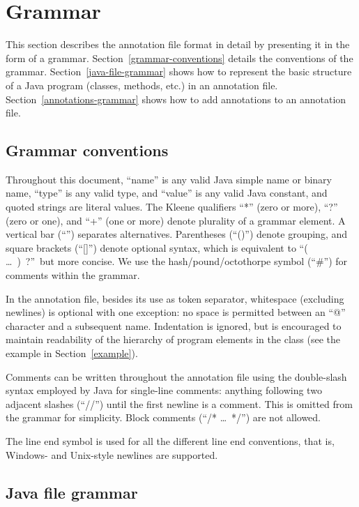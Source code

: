 \documentclass{article}
\begin{document}
\section{Grammar\label{grammar}}

This section describes the annotation file format in detail by presenting it in
the form of a grammar. Section~\ref{grammar-conventions} details the conventions
of the grammar. Section~\ref{java-file-grammar} shows how to represent the
basic structure of a Java program (classes, methods, etc.) in an annotation
file. Section~\ref{annotations-grammar} shows how to add annotations to an
annotation file.

\subsection{Grammar conventions\label{grammar-conventions}}

Throughout this document, ``name'' is any valid Java simple name or 
binary name, ``type'' is any valid type, and ``value'' is any
valid Java constant, and quoted strings are literal values.
%
The Kleene qualifiers ``*'' (zero or more), ``?'' (zero or one), and ``+''
(one or more) denote plurality of a grammar element.
%
A vertical bar (``\bnfor'') separates alternatives.
Parentheses (``()'') denote grouping, and square brackets (``[]'')
denote optional syntax, which is equivalent to ``( \ldots\ )\ ?''\ but more concise.
We use the hash/pound/octothorpe symbol (``\#'') for comments within the grammar. 

In the annotation file,
besides its use as token separator, 
whitespace (excluding
newlines) is optional with one exception: no space is permitted
between an ``@'' character and a subsequent name. Indentation is
ignored, but is encouraged to maintain readability of the hierarchy of
program elements in the class (see the example in Section~\ref{example}).

Comments can be written throughout the annotation file using the double-slash
syntax employed by Java for single-line comments: anything following
two adjacent slashes (``//'') until the first newline is a comment.
This is omitted from the grammar for simplicity.
Block comments (``/* \ldots\ */'') are not allowed.

The line end symbol \lineend{} is used for all the different line end
conventions, that is, Windows- and Unix-style newlines are supported.


\subsection{Java file grammar\label{java-file-grammar}}
\end{document}
